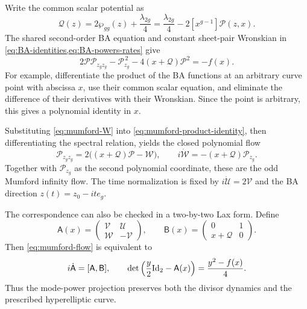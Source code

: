Write the common scalar potential as
\begin{equation}\label{eq:mumford-potential}
 \mathcal Q(z)=2\wp_{gg}(z)+\frac{\lambda_{2g}}4
 =\frac{\lambda_{2g}}4-2[x^{g-1}]\mathcal P(z,x).
\end{equation}
The shared second-order BA equation and constant sheet-pair
Wronskian in \cref{eq:BA-identities,eq:BA-powers-rates} give
\begin{equation}\label{eq:mumford-product-identity}
 2\mathcal P\mathcal P_{z_gz_g}-\mathcal P_{z_g}^{\,2}
       -4(x+\mathcal Q)\mathcal P^2=-f(x).
\end{equation}
For example, differentiate the product of the BA functions at an
arbitrary curve point with abscissa $x$, use their common scalar
equation, and eliminate the difference of their derivatives with
their Wronskian. Since the point is arbitrary, this gives a
polynomial identity in $x$.

Substituting \cref{eq:mumford-W} into
\cref{eq:mumford-product-identity}, then differentiating the
spectral relation, yields the closed polynomial flow
\begin{equation}\label{eq:mumford-flow}
 \mathcal P_{z_gz_g}=2\bigl((x+\mathcal Q)\mathcal P-\mathcal W\bigr),
 \qquad
 i\dot{\mathcal W}=-(x+\mathcal Q)\mathcal P_{z_g}.
\end{equation}
Together with $\mathcal P_{z_g}$ as the second polynomial
coordinate, these are the odd Mumford infinity flow. The time
normalization is fixed by $i\dot{\mathcal U}=2\mathcal V$
and the BA direction $z(t)=z_0-it e_g$.

The correspondence can also be checked in a two-by-two Lax form.
Define
\begin{equation}\label{eq:mumford-lax-matrices}
 \mathsf A(x)=\begin{pmatrix}
 \mathcal V&\mathcal U\\
 \mathcal W&-\mathcal V
 \end{pmatrix},\qquad
 \mathsf B(x)=\begin{pmatrix}0&1\\x+\mathcal Q&0\end{pmatrix}.
\end{equation}
Then \cref{eq:mumford-flow} is equivalent to
\begin{equation}\label{eq:mumford-lax}
 i\dot{\mathsf A}=[\mathsf A,\mathsf B],\qquad
 \det\left(\frac y2\mathrm{Id}_2-\mathsf A(x)\right)
                  =\frac{y^2-f(x)}4.
\end{equation}
Thus the mode-power projection preserves both the divisor dynamics
and the prescribed hyperelliptic curve.

